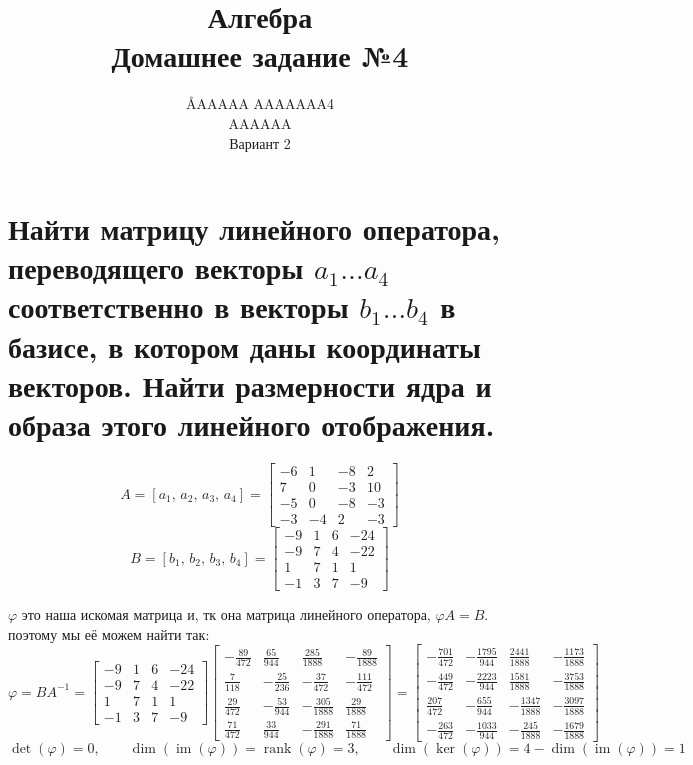 \documentclass{article}
\title{Алгебра \\ Домашнее задание №4}
\author{\AA{AAAAA AAAAAAA}{4} \\ AAAAAA \\ Вариант 2}
\renewcommand{\f}{\frac}
\renewcommand{\l}{\left}
\renewcommand{\r}{\right}
\renewcommand{\phi}{\varphi}
\DeclareMathOperator{\rank}{rank}
\DeclareMathOperator{\im}{im}
\begin{document}
  \maketitle

  \section{Найти матрицу линейного оператора, переводящего векторы $a_1 \dots a_4$ соответственно в векторы $b_1 \dots b_4$ в базисе, в котором даны координаты векторов. Найти размерности ядра и образа этого линейного отображения.}
  $$A = \l[a_1,\, a_2,\, a_3,\, a_4\r] = \begin{bmatrix}-6&1&-8&2\\7&0&-3&10\\-5&0&-8&-3\\-3&-4&2&-3\end{bmatrix}$$
  $$B = \l[b_1,\, b_2,\, b_3,\, b_4\r] = \begin{bmatrix}-9&1&6&-24\\-9&7&4&-22\\1&7&1&1\\-1&3&7&-9\end{bmatrix}$$

  \noindent
  $\phi$ это наша искомая матрица и, тк она матрица линейного оператора, $\phi A = B$.
  поэтому мы её можем найти так:
  $$\phi = BA^{-1} = \begin{bmatrix}-9&1&6&-24\\-9&7&4&-22\\1&7&1&1\\-1&3&7&-9\end{bmatrix} \begin{bmatrix}- \f{89}{472} & \f{65}{944} & \frac{285}{1888} & - \f{89}{1888}\\\f{7}{118} & - \f{25}{236} & - \f{37}{472} & - \f{111}{472}\\\f{29}{472} & - \f{53}{944} & - \f{305}{1888} & \f{29}{1888}\\\f{71}{472} & \f{33}{944} & - \f{291}{1888} & \f{71}{1888}\end{bmatrix} = \begin{bmatrix}- \f{701}{472} & - \f{1795}{944} & \f{2441}{1888} & - \f{1173}{1888}\\- \f{449}{472} & - \f{2223}{944} & \f{1581}{1888} & - \f{3753}{1888}\\\f{207}{472} & - \f{655}{944} & - \f{1347}{1888} & - \f{3097}{1888}\\- \f{263}{472} & - \f{1033}{944} & - \f{245}{1888} & - \f{1679}{1888}\end{bmatrix}$$
  $$\det(\phi) = 0, \qquad \dim(\im(\phi))=\rank(\phi) = 3, \qquad \dim(\ker(\phi))=4-\dim(\im(\phi))=1$$
\end{document}
